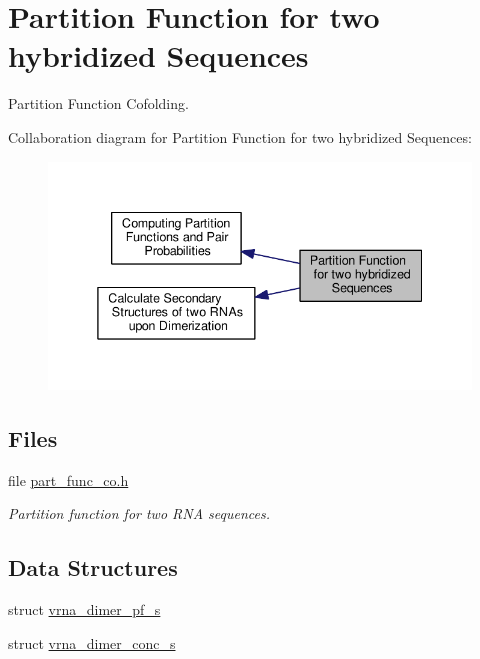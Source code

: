 \hypertarget{group__pf__cofold}{\section{Partition Function for two hybridized Sequences}
\label{group__pf__cofold}
}


Partition Function Cofolding.  


Collaboration diagram for Partition Function for two hybridized Sequences\+:
\nopagebreak
\begin{figure}[H]
\begin{center}
\leavevmode
\includegraphics[width=338pt]{group__pf__cofold}
\end{center}
\end{figure}
\subsection*{Files}
\begin{DoxyCompactItemize}
\item 
file \hyperlink{part__func__co_8h}{part\+\_\+func\+\_\+co.\+h}
\begin{DoxyCompactList}\small\item\em Partition function for two R\+N\+A sequences. \end{DoxyCompactList}\end{DoxyCompactItemize}
\subsection*{Data Structures}
\begin{DoxyCompactItemize}
\item 
struct \hyperlink{group__pf__cofold_structvrna__dimer__pf__s}{vrna\+\_\+dimer\+\_\+pf\+\_\+s}
\item 
struct \hyperlink{group__pf__cofold_structvrna__dimer__conc__s}{vrna\+\_\+dimer\+\_\+conc\+\_\+s}
\end{DoxyCompactItemize}

